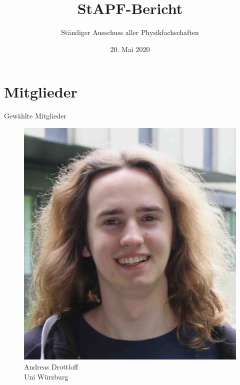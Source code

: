 \documentclass[compress, aspectratio=169]{beamer}
\title[StAPf-Bericht]{StAPF-Bericht}
\author{Ständiger Ausschuss aller Physikfachschaften}
\institute[Zusammenkunft aller Physikfachschaften]
\date{20. Mai 2020}
\begin{document}
\begin{frame}[plain]{}
  \titlepage
\end{frame}

\section{Mitglieder}

\begin{frame}{Gewählte Mitglieder}
  \begin{minipage}{.32\textwidth}
    \begin{figure}
      \begin{minipage}[c]{.57\textwidth}
        \includegraphics[width=\textwidth]{andy.jpg}
      \end{minipage} \hfill
      \begin{minipage}[c]{.4\textwidth}
        \caption*{Andreas Drottloff\\Uni Würzburg}
      \end{minipage}
    \end{figure}
  \end{minipage}
\hfill
  \begin{minipage}{.32\textwidth}
    \begin{figure}

\end{figure}
\end{minipage}
\end{frame}
\end{document}
